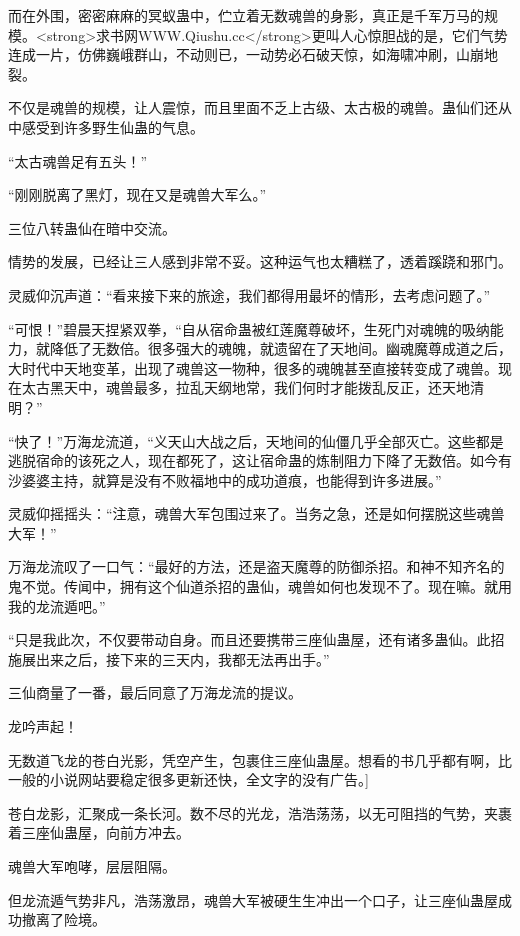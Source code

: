 
\begin{this_body}

而在外围，密密麻麻的冥蚁蛊中，伫立着无数魂兽的身影，真正是千军万马的规模。<strong>求书网WWW.Qiushu.cc</strong>更叫人心惊胆战的是，它们气势连成一片，仿佛巍峨群山，不动则已，一动势必石破天惊，如海啸冲刷，山崩地裂。

不仅是魂兽的规模，让人震惊，而且里面不乏上古级、太古极的魂兽。蛊仙们还从中感受到许多野生仙蛊的气息。

“太古魂兽足有五头！”

“刚刚脱离了黑灯，现在又是魂兽大军么。”

三位八转蛊仙在暗中交流。

情势的发展，已经让三人感到非常不妥。这种运气也太糟糕了，透着蹊跷和邪门。

灵威仰沉声道：“看来接下来的旅途，我们都得用最坏的情形，去考虑问题了。”

“可恨！”碧晨天捏紧双拳，“自从宿命蛊被红莲魔尊破坏，生死门对魂魄的吸纳能力，就降低了无数倍。很多强大的魂魄，就遗留在了天地间。幽魂魔尊成道之后，大时代中天地变革，出现了魂兽这一物种，很多的魂魄甚至直接转变成了魂兽。现在太古黑天中，魂兽最多，拉乱天纲地常，我们何时才能拨乱反正，还天地清明？”

“快了！”万海龙流道，“义天山大战之后，天地间的仙僵几乎全部灭亡。这些都是逃脱宿命的该死之人，现在都死了，这让宿命蛊的炼制阻力下降了无数倍。如今有沙婆婆主持，就算是没有不败福地中的成功道痕，也能得到许多进展。”

灵威仰摇摇头：“注意，魂兽大军包围过来了。当务之急，还是如何摆脱这些魂兽大军！”

万海龙流叹了一口气：“最好的方法，还是盗天魔尊的防御杀招。和神不知齐名的鬼不觉。传闻中，拥有这个仙道杀招的蛊仙，魂兽如何也发现不了。现在嘛。就用我的龙流遁吧。”

“只是我此次，不仅要带动自身。而且还要携带三座仙蛊屋，还有诸多蛊仙。此招施展出来之后，接下来的三天内，我都无法再出手。”

三仙商量了一番，最后同意了万海龙流的提议。

龙吟声起！

无数道飞龙的苍白光影，凭空产生，包裹住三座仙蛊屋。想看的书几乎都有啊，比一般的小说网站要稳定很多更新还快，全文字的没有广告。]

苍白龙影，汇聚成一条长河。数不尽的光龙，浩浩荡荡，以无可阻挡的气势，夹裹着三座仙蛊屋，向前方冲去。

魂兽大军咆哮，层层阻隔。

但龙流遁气势非凡，浩荡激昂，魂兽大军被硬生生冲出一个口子，让三座仙蛊屋成功撤离了险境。


\end{this_body}
